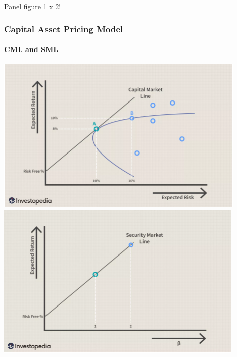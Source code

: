 \documentclass[10pt]{beamer}
\begin{document}
\begin{frame}{Panel figure  1 x 2!}
    \frametitle{Capital Asset Pricing Model}
    \framesubtitle{CML and SML}
    \begin{minipage}{\textwidth}
        \includegraphics[scale=0.45]{CML.png}
        \includegraphics[scale=0.45]{SML.png}
        
      \end{minipage}


\end{frame}
\end{document}
